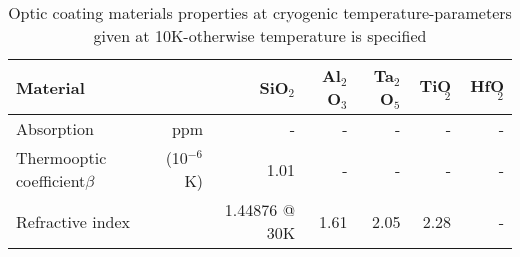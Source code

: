 \begin{table}
\begin{center}
\begin{tabular}{|l r||r|r|r|r|r|}
  \hline
    {\large\strut} Material  & & SiO$_2$ & Al$_2$O$_3$ & Ta$_2$O$_5$ & TiO$_2$ & HfO$_2$ \\
  \hline
  \hline
   {\large\strut} Absorption & ppm & - & - & - & - & - \\
   {\large\strut} \parbox{0.1\linewidth} {Thermooptic \\ coefficient$\beta$}  & (10$^{-6}$K) &  1.01 & - & - & -& -  \\
   {\large\strut} Refractive index & & 1.44876 @ 30K & 1.61 & 2.05 & 2.28 & - \\
  \hline
\end{tabular}
\end{center}
\caption{Optic coating materials properties at cryogenic temperature-parameters
given at 10K-otherwise temperature is specified}
\label{tab:Optic_Coat_Param_cryo}
\end{table}

